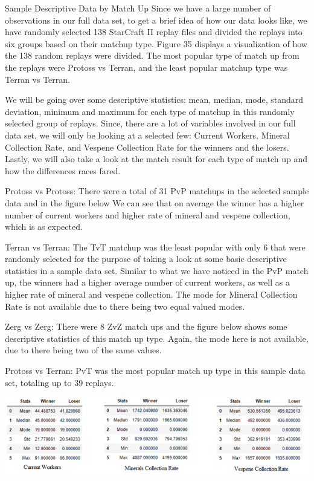 \documentclass[a4paper,12pt]{report}
\begin{document}
Sample Descriptive Data by Match Up
Since we have a large number of observations in our full data set, to get a brief idea of how our data looks like, we have randomly selected 138 StarCraft II replay files and divided the replays into six groups based on their matchup type. Figure 35 displays a visualization of how the 138 random replays were divided. The most popular type of match up from the replays were Protoss vs Terran, and the least popular matchup type was Terran vs Terran. 

We will be going over some descriptive statistics: mean, median, mode, standard deviation, minimum and maximum for each type of matchup in this randomly selected group of replays. Since, there are a lot of variables involved in our full data set, we will only be looking at a selected few: Current Workers, Mineral Collection Rate, and Vespene Collection Rate for the winners and the losers. Lastly, we will also take a look at the match result for each type of match up and how the differences races fared. 

Protoss vs Protoss:
There were a total of 31 PvP matchups in the selected sample data and in the figure below We can see that on average the winner has a higher number of current workers and higher rate of mineral and vespene collection, which is as expected. 

Terran vs Terran:
The TvT matchup was the least popular with only 6 that were randomly selected for the purpose of taking a look at some basic descriptive statistics in a sample data set. Similar to what we have noticed in the PvP match up, the winners had a higher average number of current workers, as well as a higher rate of mineral and vespene collection. The mode for Mineral Collection Rate is not available due to there being two equal valued modes. 

Zerg vs Zerg:
There were 8 ZvZ match ups and the figure below shows some descriptive statistics of this match up type. Again, the mode here is not available, due to there being two of the same values. 

Protoss vs Terran:
PvT was the most popular match up type in this sample data set, totaling up to 39 replays.

\begin{center}
    \captionsetup{type=figure}
    \includegraphics[width=.9\linewidth]{media/TerranWinnervsLoser.png}
\end{center}
\end{document}
